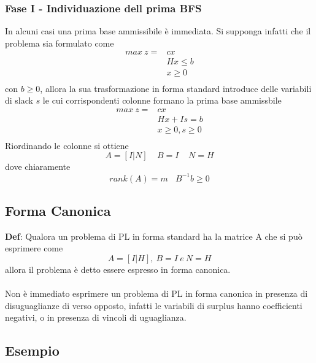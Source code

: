 \documentclass[12pt,a4paper]{article}
\begin{document}
\subsubsection{Fase I - Individuazione dell prima BFS}
In alcuni casi una prima base ammissibile è immediata. Si supponga infatti che il problema sia formulato come\\ $$\begin{array}{cl}max \ z = & cx\\
& Hx \leq b\\
& x \geq 0\\
\end{array}$$
con $b\geq 0$, allora la sua trasformazione in forma standard introduce delle variabili di slack $s$ le cui corrispondenti colonne formano la prima base ammissbile
$$\begin{array}{cl}max \ z = & cx\\
& Hx + Is = b\\
& x \geq 0, s\geq 0\\
\end{array}$$
Riordinando le colonne si ottiene $$A=[I|N] \ \ \ \ \ B=I \ \ \ \ \ N=H$$
dove chiaramente $$rank(A)=m \ \ \ \ B^{-1}b \geq 0$$


\subsection{Forma Canonica}
\textbf{Def}: Qualora un problema di PL in forma standard ha la matrice A che si può esprimere come $$A=[I|H], \ B=I \ e \ N=H$$ allora il problema è detto essere espresso in forma canonica.\\
\\
Non è immediato esprimere un problema di PL in forma canonica in presenza di disuguaglianze di verso opposto, infatti le variabili di surplus hanno coefficienti negativi, o in presenza di vincoli di uguaglianza.

\subsection{Esempio}
\begin{Parallel}{0.45 \textwidth}{0.45 \textwidth}
\end{Parallel}
\end{document}
